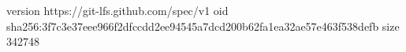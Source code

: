 version https://git-lfs.github.com/spec/v1
oid sha256:3f7c3e37eee966f2dfccdd2ee94545a7dcd200b62fa1ea32ae57e463f538defb
size 342748
